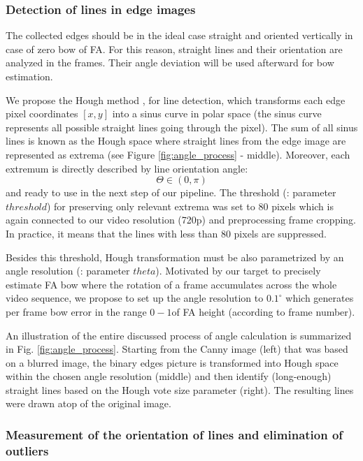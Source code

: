 \documentclass[preprint,12pt]{elsarticle}
\begin{document}
\subsubsection{Detection of lines in edge images}

The collected edges should be in the ideal case straight and oriented vertically in case of zero bow of \ac{FA}. For this reason, straight lines and their orientation are analyzed in the frames. Their angle deviation will be used afterward for bow estimation.

We propose the Hough method \cite{Hough1962, OpenCVHough}, for line detection, which transforms each edge pixel coordinates $[x,y]$ into a sinus curve in polar space (the sinus curve represents all possible straight lines going through the pixel). The sum of all sinus lines is known as the Hough space where straight lines from the edge image are represented as extrema (see Figure \ref{fig:angle_process} - middle). Moreover, each extremum is directly described by line orientation angle:
\begin{equation}
    \Theta \in (0,\pi)
\end{equation} 
and ready to use in the next step of our pipeline. The threshold (\cite{OpenCVHoughTransform}: parameter $threshold$) for preserving only relevant extrema was set to 80 pixels which is again connected to our video resolution (720p) and preprocessing frame cropping. In practice, it means that the lines with less than 80 pixels are suppressed.

Besides this threshold, Hough transformation must be also parametrized by an angle resolution (\cite{OpenCVHoughTransform}: parameter $theta$). Motivated by our target to precisely estimate \ac{FA} bow where the rotation of a frame accumulates across the whole video sequence, we propose to set up the angle resolution to $0.1^\circ$ which generates per frame bow error in the range $0-1$\textperthousand of \ac{FA} height (according to frame number).

An illustration of the entire discussed process of angle calculation is summarized in Fig. \ref{fig:angle_process}. Starting from the Canny image (left) that was based on a blurred image, the binary edges picture is transformed into Hough space within the chosen angle resolution (middle) and then identify (long-enough) straight lines based on the Hough vote size parameter (right). The resulting lines were drawn atop of the original image.

\subsubsection{Measurement of the orientation of lines and elimination of outliers}
\end{document}
